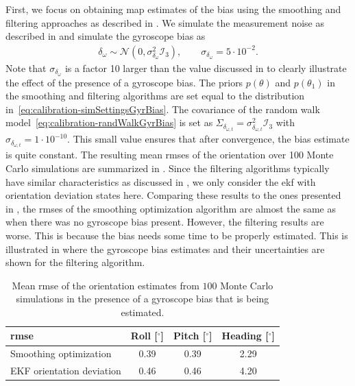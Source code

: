 First, we focus on obtaining \gls{map} estimates of the bias using the smoothing and filtering approaches as described in . We simulate the measurement noise as described in  and simulate the gyroscope bias as 
\begin{align}
\label{eq:calibration-simSettingsGyrBias}
\delta_\omega \sim \mathcal{N}(0, \sigma_{\delta_\omega}^2 \mathcal{I}_3), \qquad \sigma_{\delta_\omega} = 5 \cdot 10^{-2}. 
\end{align}
Note that $\sigma_{\delta_\omega}$ is a factor 10 larger than the value discussed in  to clearly illustrate the effect of the presence of a gyroscope bias. The priors $p(\theta)$ and $p(\theta_1)$ in the smoothing and filtering algorithms are set equal to the distribution in~\eqref{eq:calibration-simSettingsGyrBias}. The covariance of the random walk model~\eqref{eq:calibration-randWalkGyrBias} is set as $\Sigma_{\delta_{\omega,t}} = \sigma_{\delta_{\omega,t}}^2 \mathcal{I}_3$ with $\sigma_{\delta_{\omega,t}} = 1 \cdot 10^{-10}$. This small value ensures that after convergence, the bias estimate is quite constant. The resulting mean \glspl{rmse} of the orientation over 100 Monte Carlo simulations are summarized in . Since the filtering algorithms typically have similar characteristics as discussed in , we only consider the \gls{ekf} with orientation deviation states here. Comparing these results to the ones presented in , the \glspl{rmse} of the smoothing optimization algorithm are almost the same as when there was no gyroscope bias present. However, the filtering results are worse. This is because the bias needs some time to be properly estimated. This is illustrated in  where the gyroscope bias estimates and their uncertainties are shown for the filtering algorithm.

\begin{table}
\caption{Mean \gls{rmse} of the orientation estimates from $100$ Monte Carlo simulations in the presence of a gyroscope bias that is being estimated.}
\label{tab:calibration-rmsSim}
\begin{center}
\small
\begin{tabular}{lccc}
\toprule
\Gls{rmse} & Roll [$^\circ$]& Pitch [$^\circ$] & Heading [$^\circ$] \\
\midrule
Smoothing optimization & 0.39 & 0.39 & 2.29 \\
EKF orientation deviation & 0.46 & 0.46 & 4.20 \\
\bottomrule
\end{tabular}
\normalsize
\end{center}
\end{table}

